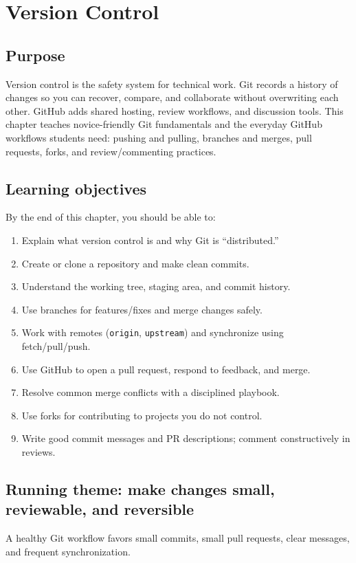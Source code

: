 \chapter{Version Control}
\label{ch:git-github}

\section*{Purpose}
Version control is the safety system for technical work. Git records a history of changes so you can recover, compare, and collaborate without overwriting each other. GitHub adds shared hosting, review workflows, and discussion tools. This chapter teaches novice-friendly Git fundamentals and the everyday GitHub workflows students need: pushing and pulling, branches and merges, pull requests, forks, and review/commenting practices.

\section*{Learning objectives}
By the end of this chapter, you should be able to:
\begin{enumerate}
\item Explain what version control is and why Git is ``distributed.''
\item Create or clone a repository and make clean commits.
\item Understand the working tree, staging area, and commit history.
\item Use branches for features/fixes and merge changes safely.
\item Work with remotes (\texttt{origin}, \texttt{upstream}) and synchronize using fetch/pull/push.
\item Use GitHub to open a pull request, respond to feedback, and merge.
\item Resolve common merge conflicts with a disciplined playbook.
\item Use forks for contributing to projects you do not control.
\item Write good commit messages and PR descriptions; comment constructively in reviews.
\end{enumerate}

\section*{Running theme: make changes small, reviewable, and reversible}
A healthy Git workflow favors small commits, small pull requests, clear messages, and frequent synchronization.

